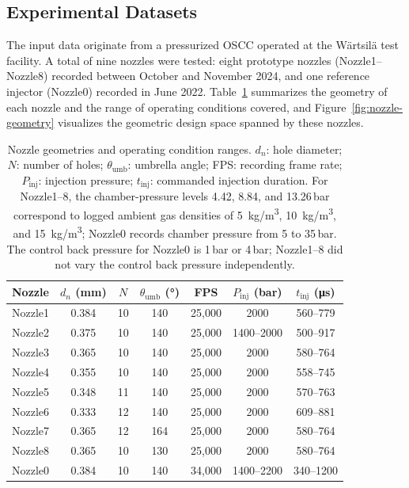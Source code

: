 \subsection{Experimental Datasets}

The input data originate from a pressurized OSCC operated at the Wärtsilä test facility.
A total of nine nozzles were tested: eight prototype nozzles (Nozzle1--Nozzle8) recorded between October and November 2024,
and one reference injector (Nozzle0) recorded in June 2022.
Table~\ref{tab:nozzle-overview} summarizes the geometry of each nozzle and the range of operating conditions covered,
and Figure~\ref{fig:nozzle-geometry} visualizes the geometric design space spanned by these nozzles.

\begin{table}[!ht]
\centering
\footnotesize
\setlength{\tabcolsep}{4pt}
\renewcommand{\arraystretch}{1.1}
\begin{tabular}{@{}lcccccc@{}}
\toprule
Nozzle & $d_n$ (mm) & $N$ & $\theta_{\mathrm{umb}}$ (°) & FPS & $P_{\mathrm{inj}}$ (bar) & $t_{\mathrm{inj}}$ (\si{\micro s}) \\
\midrule
Nozzle1 & 0.384 & 10 & 140 & 25{,}000 & 2000          & 560--779   \\
Nozzle2 & 0.375 & 10 & 140 & 25{,}000 & 1400--2000    & 500--917   \\
Nozzle3 & 0.365 & 10 & 140 & 25{,}000 & 2000          & 580--764   \\
Nozzle4 & 0.355 & 10 & 140 & 25{,}000 & 2000          & 558--745   \\
Nozzle5 & 0.348 & 11 & 140 & 25{,}000 & 2000          & 570--763   \\
Nozzle6 & 0.333 & 12 & 140 & 25{,}000 & 2000          & 609--881   \\
Nozzle7 & 0.365 & 12 & 164 & 25{,}000 & 2000          & 580--764   \\
Nozzle8 & 0.365 & 10 & 130 & 25{,}000 & 2000          & 580--764   \\
Nozzle0 & 0.384 & 10 & 140 & 34{,}000 & 1400--2200    & 340--1200  \\
\bottomrule
\end{tabular}
\caption{Nozzle geometries and operating condition ranges. $d_n$: hole diameter; $N$: number of holes; $\theta_{\mathrm{umb}}$: umbrella angle; FPS: recording frame rate; $P_{\mathrm{inj}}$: injection pressure; $t_{\mathrm{inj}}$: commanded injection duration. For Nozzle1--8, the chamber-pressure levels 4.42, 8.84, and 13.26\,bar correspond to logged ambient gas densities of \SI{5}{kg/m^3}, \SI{10}{kg/m^3}, and \SI{15}{kg/m^3}; Nozzle0 records chamber pressure from 5 to 35\,bar. The control back pressure for Nozzle0 is 1\,bar or 4\,bar; Nozzle1--8 did not vary the control back pressure independently.}
\label{tab:nozzle-overview}
\end{table}

